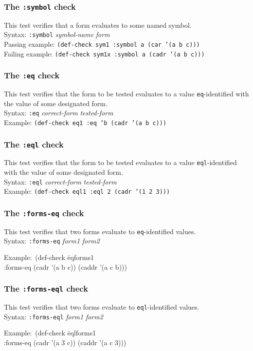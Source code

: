 \documentclass{article}
\begin{document}
\subsubsection{The \texttt{:symbol} check} 
This test verifies that a form evaluates to some named
symbol.
\\ Syntax: \texttt{:symbol} \textit{symbol-name} \textit{form}
\\ Passing example: \texttt{(def-check sym1 :symbol a (car '(a b c)))}
\\ Failing example: \texttt{(def-check sym1x :symbol a (cadr '(a b c)))}

\subsubsection{The \texttt{:eq} check} 
This test verifies that the form to be tested evaluates to a value
\texttt{eq}-identified with the value of some designated
form.
\\ Syntax: \texttt{:eq} \textit{correct-form} \textit{tested-form}
\\ Example: \texttt{(def-check eq1 :eq 'b (cadr '(a b c)))}

\subsubsection{The \texttt{:eql} check} 
This test verifies that the form to be tested evaluates to a value
\texttt{eql}-identified with the value of some designated
form.
\\ Syntax: \texttt{:eql} \textit{correct-form} \textit{tested-form}
\\ Example: \texttt{(def-check eql1 :eql 2 (cadr '(1 2 3)))}

\subsubsection{The \texttt{:forms-eq} check} 
This test verifies that two forms evaluate to \texttt{eq}-identified
values.
\\ Syntax: \texttt{:forms-eq} \textit{form1} \textit{form2}
{\ttfamily\begin{tabbing}
\textrm{Example:}\ (def-check \=eqforms1
\\ \>  :forms-eq (cadr '(a b c)) (caddr '(a c b)))
\end{tabbing}}

\subsubsection{The \texttt{:forms-eql} check} 
This test verifies that two forms evaluate to \texttt{eql}-identified
values.
\\ Syntax: \texttt{:forms-eql} \textit{form1} \textit{form2}
{\ttfamily\begin{tabbing}
\textrm{Example:}\ (def-check \=eqlforms1
\\ \>  :forms-eq (cadr '(a 3 c)) (caddr '(a c 3)))
\end{tabbing}}
\end{document}
